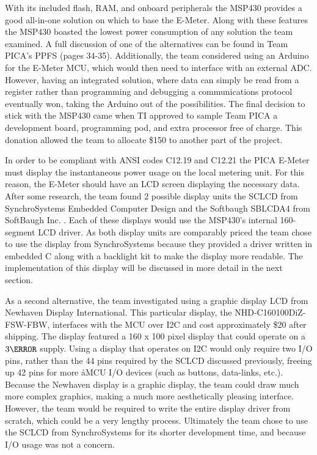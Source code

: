 With its included flash, RAM, and onboard peripherals the MSP430 provides a good all-in-one solution on which to base the E-Meter. Along with these features the MSP430 boasted the lowest power consumption of any solution the team examined. A full discussion of one of the alternatives can be found in Team PICA's \ac{PPFS} (pages 34-35)\cite{PICA_PPFS}. Additionally, the team considered using an Arduino for the E-Meter \ac{MCU}, which would then need to interface with an external \ac{ADC}. However, having an integrated solution, where data can simply be read from a register rather than programming and debugging a communications protocol eventually won, taking the Arduino out of the possibilities. The final decision to stick with the MSP430 came when \ac{TI} approved to sample Team PICA a development board, programming pod, and extra processor free of charge. This donation allowed the team to allocate \$150 to another part of the project. 

In order to be compliant with \ac{ANSI} codes C12.19 \cite{ANSIC1219} and C12.21 \cite{ANSIC1221} the PICA E-Meter must display the instantaneous power usage on the local metering unit. For this reason, the E-Meter should have an \ac{LCD} screen displaying the necessary data. After some research, the team found 2 possible display units the SCLCD from SynchroSystems Embedded Computer Design \cite{Synchro} and  the Softbaugh SBLCDA4 from SoftBaugh Inc. \cite{SoftBaugh}. Each of these displays would use the MSP430's internal 160-segment \ac{LCD} driver. As both display units are comparably priced the team chose to use the display from SynchroSystems because they provided a driver written in embedded C along with a backlight kit to make the display more readable. The implementation of this display will be discussed in more detail in the next section.

As a second alternative, the team investigated using a graphic display \ac{LCD} from Newhaven Display International. This particular display, the NHD-C160100DiZ-FSW-FBW, interfaces with the \ac{MCU} over I2C and cost approximately \$20 after shipping. The display featured a 160 x 100 pixel display that could operate on a $3\volt$ supply. Using a display that operates on I2C would only require two I/O pins, rather than the 44 pins required by the SCLCD discussed previously, freeing up 42 pins for more \aa{MCU} I/O devices (such as buttons, data-links, etc.). Because the Newhaven display is a graphic display, the team could draw much more complex graphics, making a much more aesthetically pleasing interface. However, the team would be required to write the entire display driver from scratch, which could be a very lengthy process. Ultimately the team chose to use the SCLCD from SynchroSystems for its shorter development time, and because I/O usage was not a concern. 

